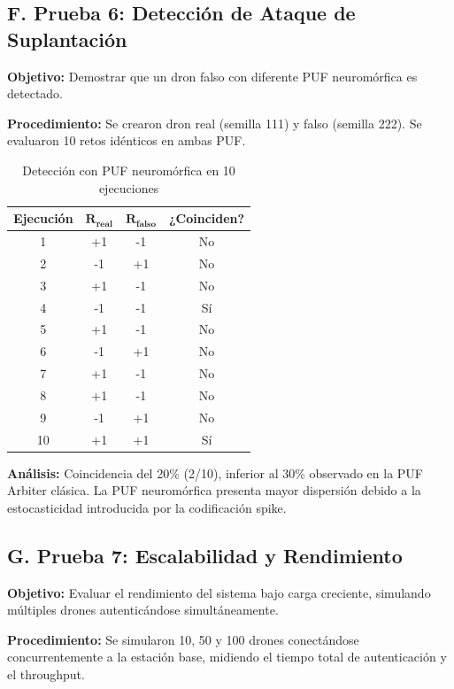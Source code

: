 \subsection*{F. Prueba 6: Detección de Ataque de Suplantación}

\textbf{Objetivo:} Demostrar que un dron falso con diferente PUF neuromórfica es detectado.

\textbf{Procedimiento:} Se crearon dron real (semilla 111) y falso (semilla 222). Se evaluaron 10 retos idénticos en ambas PUF.

\begin{table}[H]
    \centering\footnotesize\setlength{\tabcolsep}{3pt}
    \caption{Detección con PUF neuromórfica en 10 ejecuciones}
    \label{tab:attack-neuro}
    \begin{tabular}{|c|c|c|c|}
        \hline
        \textbf{Ejecución} & $\mathbf{R_{real}}$ & $\mathbf{R_{falso}}$ & \textbf{¿Coinciden?} \\
        \hline
        1 & +1 & -1 & No \\
        2 & -1 & +1 & No \\
        3 & +1 & -1 & No \\
        4 & -1 & -1 & Sí \\
        5 & +1 & -1 & No \\
        6 & -1 & +1 & No \\
        7 & +1 & -1 & No \\
        8 & +1 & -1 & No \\
        9 & -1 & +1 & No \\
        10 & +1 & +1 & Sí \\
        \hline
    \end{tabular}
\end{table}

\textbf{Análisis:} Coincidencia del 20\% (2/10), inferior al 30\% observado en la PUF Arbiter clásica. La PUF neuromórfica presenta mayor dispersión debido a la estocasticidad introducida por la codificación spike.

\subsection*{G. Prueba 7: Escalabilidad y Rendimiento}

\textbf{Objetivo:} Evaluar el rendimiento del sistema bajo carga creciente, simulando múltiples drones autenticándose simultáneamente.

\textbf{Procedimiento:} Se simularon 10, 50 y 100 drones conectándose concurrentemente a la estación base, midiendo el tiempo total de autenticación y el throughput.

